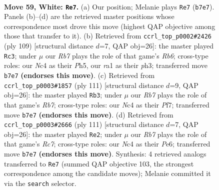 \documentclass[11pt]{article}
\begin{document}
\clearpage

\begin{figure}[p]\centering
\begin{subfigure}{0.46\textwidth}\centering
\resizebox{\linewidth}{!}{%
\newchessgame
\chessboard[
  setfen={8/1R4p1/5pk1/7p/2NP3P/6P1/7K/r7 w - - 11 59},
  showmover=false,
  pgfstyle=straightmove, color=movearrow, markmove={b7-e7}
]}
\caption{}
\end{subfigure}\hfill
\begin{subfigure}{0.46\textwidth}\centering
\resizebox{\linewidth}{!}{%
\newchessgame
\chessboard[
  setfen={8/6pk/5p2/5P1p/4PK2/1r3P1P/8/R7 b - - 12 55},
  showmover=false,
  pgfstyle=straightmove, color=movearrow, markmove={b3-c3}
]}
\caption{}
\end{subfigure}
\\[4pt]
\begin{subfigure}{0.46\textwidth}\centering
\resizebox{\linewidth}{!}{%
\newchessgame
\chessboard[
  setfen={8/5pk1/7p/6p1/6P1/4PK1P/1r3P2/2R5 b - - 23 56},
  showmover=false,
  pgfstyle=straightmove, color=movearrow, markmove={b2-b3}
]}
\caption{}
\end{subfigure}\hfill
\begin{subfigure}{0.46\textwidth}\centering
\resizebox{\linewidth}{!}{%
\newchessgame
\chessboard[
  setfen={5k2/1R6/4p1p1/4P2p/7P/5PK1/2r3P1/8 b - - 2 56},
  showmover=false,
  pgfstyle=straightmove, color=movearrow, markmove={c2-e2}
]}
\caption{}
\end{subfigure}
\caption{\textbf{Move 59, White: \texttt{Re7}.} (a) Our position; Melanie plays \texttt{Re7} (\texttt{b7e7}). Panels (b)--(d) are the retrieved master positions whose correspondence most drove this move (highest QAP objective among those that transfer to it). (b) Retrieved from \texttt{ccrl\_top\_p0002\#2426} (ply 109) [structural distance $d$=7, QAP obj=26]: the master played \texttt{Rc3}; under $\mu$ our \emph{Rb7} plays the role of that game's \emph{Rb6}; cross-type roles: our \emph{N}c4 as their \emph{P}h5, our \emph{r}a1 as their \emph{p}h3; transferred move \texttt{b7e7} \textbf{(endorses this move)}. (c) Retrieved from \texttt{ccrl\_top\_p0003\#1857} (ply 111) [structural distance $d$=9, QAP obj=26]: the master played \texttt{Rb3}; under $\mu$ our \emph{Rb7} plays the role of that game's \emph{Rb7}; cross-type roles: our \emph{N}c4 as their \emph{P}f7; transferred move \texttt{b7e7} \textbf{(endorses this move)}. (d) Retrieved from \texttt{ccrl\_top\_p0003\#2666} (ply 111) [structural distance $d$=7, QAP obj=26]: the master played \texttt{Re2}; under $\mu$ our \emph{Rb7} plays the role of that game's \emph{Rc7}; cross-type roles: our \emph{N}c4 as their \emph{P}e6; transferred move \texttt{b7e7} \textbf{(endorses this move)}. Synthesis: 4 retrieved analogs transferred to \texttt{Re7} (summed QAP objective 103, the strongest correspondence among the candidate moves); Melanie committed it via the \texttt{search} selector.}
\label{fig:thought-m116}
\end{figure}
\end{document}

